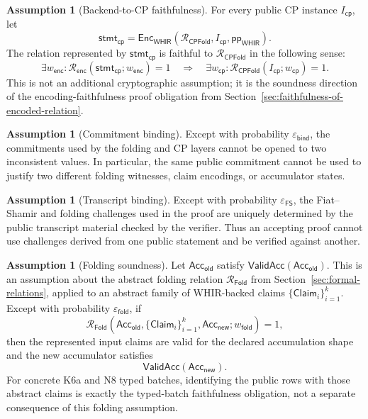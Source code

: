 \documentclass[11pt]{article}
\theoremstyle{definition}
\newtheorem{assumption}[theorem]{Assumption}
\newcommand{\WHIR}{\mathsf{WHIR}}
\newcommand{\Acc}{\mathsf{Acc}}
\newcommand{\Rfold}{\mathcal{R}_{\mathsf{Fold}}}
\newcommand{\Rcp}{\mathcal{R}_{\mathsf{CPFold}}}
\newcommand{\Renc}{\mathcal{R}_{\mathsf{enc}}}
\begin{document}
\begin{assumption}[Backend-to-CP faithfulness]
\label{assump:backend-cp-faithfulness}
For every public CP instance \(I_{\mathsf{cp}}\), let
\[
  \mathsf{stmt}_{\mathsf{cp}}
  =
  \mathsf{Enc}_{\WHIR}(\Rcp,I_{\mathsf{cp}},\mathsf{pp}_{\WHIR}).
\]
The relation represented by \(\mathsf{stmt}_{\mathsf{cp}}\) is faithful to
\(\Rcp\) in the following sense:
\[
  \exists w_{\mathsf{enc}} :
  \Renc(\mathsf{stmt}_{\mathsf{cp}};w_{\mathsf{enc}})=1
  \quad\Longrightarrow\quad
  \exists w_{\mathsf{cp}} :
  \Rcp(I_{\mathsf{cp}};w_{\mathsf{cp}})=1.
\]
This is not an additional cryptographic assumption; it is the soundness
direction of the encoding-faithfulness proof obligation from
Section~\ref{sec:faithfulness-of-encoded-relation}.
\end{assumption}

\begin{assumption}[Commitment binding]
\label{assump:commitment-binding}
Except with probability \(\varepsilon_{\mathsf{bind}}\), the commitments used
by the folding and CP layers cannot be opened to two inconsistent values. In
particular, the same public commitment cannot be used to justify two different
folding witnesses, claim encodings, or accumulator states.
\end{assumption}

\begin{assumption}[Transcript binding]
\label{assump:transcript-binding}
Except with probability \(\varepsilon_{\mathsf{FS}}\), the Fiat--Shamir and
folding challenges used in the proof are uniquely determined by the public
transcript material checked by the verifier. Thus an accepting proof cannot use
challenges derived from one public statement and be verified against another.
\end{assumption}

\begin{assumption}[Folding soundness]
\label{assump:folding-soundness}
Let \(\Acc_{\mathsf{old}}\) satisfy \(\mathsf{ValidAcc}(\Acc_{\mathsf{old}})\).
This is an assumption about the abstract folding relation
\(\Rfold\) from Section~\ref{sec:formal-relations}, applied to an abstract
family of WHIR-backed claims
\(\{\mathsf{Claim}_i\}_{i=1}^k\).
Except with probability \(\varepsilon_{\mathsf{fold}}\), if
\[
  \Rfold\!\left(
    \Acc_{\mathsf{old}},
    \{\mathsf{Claim}_i\}_{i=1}^k,
    \Acc_{\mathsf{new}};
    w_{\mathsf{fold}}
  \right)=1,
\]
then the represented input claims are valid for the declared accumulation shape
and the new accumulator satisfies
\[
  \mathsf{ValidAcc}(\Acc_{\mathsf{new}}).
\]
For concrete K6a and N8 typed batches, identifying the public rows with those
abstract claims is exactly the typed-batch faithfulness obligation, not a
separate consequence of this folding assumption.
\end{assumption}
\end{document}
